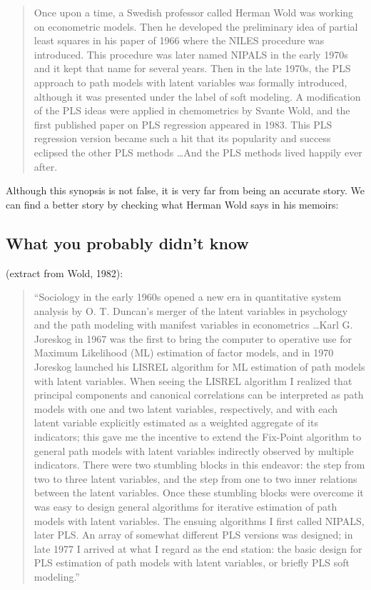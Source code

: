 \documentclass[12pt]{book}\usepackage{graphicx, color}
\begin{document}
\begin{quotation}\noindent
Once upon a time, a Swedish professor called Herman Wold was working on econometric models. Then he developed the preliminary idea of partial least squares in his paper of 1966 where the NILES procedure was introduced. This procedure was later named NIPALS in the early 1970s and it kept that name for several years. Then in the late 1970s, the PLS approach to path models with latent variables was formally introduced, although it was presented under the label of soft modeling. A modification of the PLS ideas were applied in chemometrics by Svante Wold, and the first published paper on PLS regression appeared in 1983. This PLS regression version became such a hit that its popularity and success eclipsed the other PLS methods \dots And the PLS methods lived happily ever after.
\end{quotation}

Although this synopsis is not false, it is very far from being an accurate story. We can find a better story by checking what Herman Wold says in his memoirs:


\subsection*{What you probably didn't know}
(extract from Wold, 1982): 
\begin{quotation}\noindent
``Sociology in the early 1960s opened a new era in quantitative system analysis by O. T. Duncan's merger of the latent variables in psychology and the path modeling with manifest variables in econometrics \dots Karl G. Joreskog in 1967 was the first to bring the computer to operative use for Maximum Likelihood (ML) estimation of factor models, and in 1970 Joreskog launched his LISREL algorithm for ML estimation of path models with latent variables. When seeing the LISREL algorithm I realized that principal components and canonical correlations can be interpreted as path models with one and two latent variables, respectively, and with each latent variable explicitly estimated as a weighted aggregate of its indicators; this gave me the incentive to extend the Fix-Point algorithm to general path models with latent variables indirectly observed by multiple indicators. There were two stumbling blocks in this endeavor: the step from two to three latent variables, and the step from one to two inner relations between the latent variables. Once these stumbling blocks were overcome it was easy to design general algorithms for iterative estimation of path models with latent variables. The ensuing algorithms I first called NIPALS, later PLS. An array of somewhat different PLS versions was designed; in late 1977 I arrived at what I regard as the end station: the basic design for PLS estimation of path models with latent variables, or briefly PLS soft modeling.''
\end{quotation}
\end{document}
